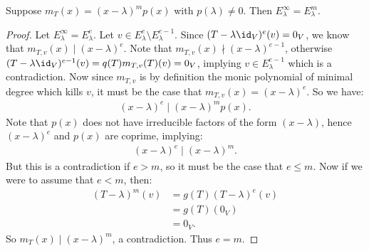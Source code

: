     \begin{lemma}\label{lemma:awful}
        Suppose $m_T(x) = (x- \lambda)^m p(x)$ with $p(\lambda) \neq 0$. Then $E_\lambda^\infty = E_\lambda^m$. 
    \end{lemma}
        \begin{proof}
            Let $E_\lambda^{\infty} = E_\lambda^e$. Let $v \in E_\lambda^{e}\setminus E_\lambda^{e-1}$. Since $(T-\lambda \id_V)^e(v) = 0_V$, we know that $m_{T,v}(x) \mid (x-\lambda)^e$. Note that $m_{T,v}(x) \nmid (x-\lambda)^{e-1}$, otherwise $(T-\lambda \id_V)^{e-1}(v) = q(T)m_{T,v}(T)(v) = 0_V$, implying $v \in E_\lambda^{e-1}$ which is a contradiction. Now since $m_{T,v}$ is by definition the monic polynomial of minimal degree which kills $v$, it must be the case that $m_{T,v}(x) = (x-\lambda)^e$. So we have:
                \begin{equation*}
                \begin{split}
                    (x-\lambda)^e \mid (x-\lambda)^m p(x).
                \end{split}
                \end{equation*}
            Note that $p(x)$ does not have irreducible factors of the form $(x- \lambda)$, hence $(x-\lambda)^e$ and $p(x)$ are coprime, implying:
                \begin{equation*}
                \begin{split}
                    (x-\lambda)^e \mid (x-\lambda)^m.
                \end{split}
                \end{equation*}
            But this is a contradiction if $e > m$, so it must be the case that $e \leq m$. Now if we were to assume that $e < m$, then:
                \begin{equation*}
                \begin{split}
                    (T - \lambda)^m(v)
                    & = g(T)(T - \lambda)^e(v) \\
                    & = g(T)(0_V) \\
                    & = 0_V.
                \end{split}
                \end{equation*}
            So $m_T(x) \mid (x- \lambda)^m$, a contradiction. Thus $e = m$.
        \end{proof}

